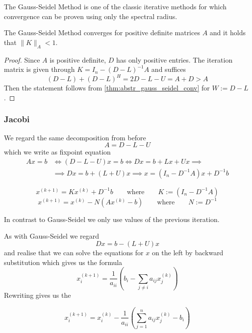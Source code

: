 

The Gauss-Seidel Method is one of the classic iterative methods for which convergence can be proven using only the spectral radius.
\begin{theorem}
   The Gauss-Seidel Method converges for positive definite matrices \(A\) and it holds that \(\|K\|_A < 1\).
\end{theorem}
\begin{proof}
   Since \(A\) is positive definite, \(D\) has only positive entries.
   The iteration matrix is given through \(K = I_n - (D-L)^{-1}A\) and suffices
   \[(D - L) + (D - L)^H = 2D - L - U = A + D > A\]
   Then the statement follows from \cref{thm:abstr_gauss_seidel_conv} for \(W := D - L\).
\end{proof}

\subsubsection{Jacobi}
We regard the same decomposition from before
\[A = D - L - U\]
which we write as fixpoint equation
\begin{equation*}
   \begin{split}
      Ax = b & \iff (D - L - U)x = b \iff Dx = b + Lx + Ux \implies \\
             & \implies Dx = b + (L + U)x \implies x = (I_n - D^{-1}A)x + D^{-1}b
   \end{split}
\end{equation*}
\begin{definition}
   \[x^{(k+1)} = Kx^{(k)} + D^{-1}b \qquad\text{where}\qquad K := (I_n - D^{-1}A)\]
   \[x^{(k+1)} = x^{(k)} - N(Ax^{(k)} - b) \qquad\text{where}\qquad N := D^{-1}\]
\end{definition}
\begin{remark}
   In contrast to Gauss-Seidel we only use values of the previous iteration.
\end{remark}
As with Gauss-Seidel we regard
\[Dx = b - (L + U)x\]
and realise that we can solve the equations for \(x\) on the left by backward substitution which gives us the formula
\[x_i^{(k+1)} = \frac{1}{a_{ii}} \left(b_i - \sum_{j \neq i} a_{ij} x_j^{(k)}\right)\]
Rewriting gives us the
\begin{definition}
   \[x_i^{(k+1)} = x_i^{(k)} - \frac{1}{a_{ii}} \left(\sum_{j=1}^n a_{ij} x_j^{(k)} - b_i\right)\]
\end{definition}


